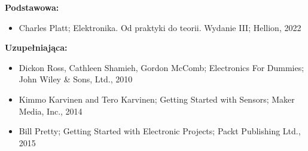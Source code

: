 \documentclass[12pt, a4paper]{article}
\begin{document}
\textbf{Podstawowa:}
\begin{itemize}
  \item Charles Platt; Elektronika. Od praktyki do teorii. Wydanie III; Hellion, 2022
\end{itemize}

\textbf{Uzupełniająca:}
\begin{itemize}
  \item Dickon Ross, Cathleen Shamieh, Gordon McComb; Electronics For Dummies; John Wiley \& Sons, Ltd., 2010
  \item Kimmo Karvinen and Tero Karvinen; Getting Started with Sensors; Maker Media, Inc., 2014
  \item Bill Pretty; Getting Started with Electronic Projects; Packt Publishing Ltd., 2015
\end{itemize}
\end{document}
